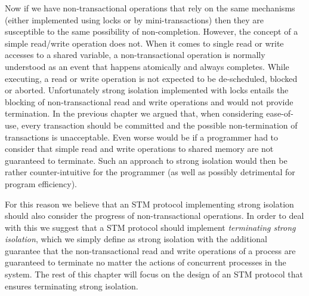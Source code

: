 Now if we have non-transactional operations that rely on the same mechanisms
(either implemented using locks or by mini-transactions) then they are susceptible
to the same possibility of non-completion.
However, the concept of a simple read/write operation does not.
When it  comes to single read or  write accesses  to  a shared
variable, a  non-transactional operation is normally understood  as an
event  that  happens   atomically  and always  completes.
While executing, a  read  or write  operation   is  not 
expected  to  be de-scheduled, blocked or aborted.  
Unfortunately   strong
isolation  implemented with  locks  entails the blocking  
of non-transactional read and write operations and would not provide termination.
In the previous chapter we argued that, when considering ease-of-use, 
every transaction should be committed and the
possible non-termination of transactions is unacceptable.
Even worse would be if a programmer had to consider that simple
read and write operations to shared memory are not guaranteed to terminate.
Such an approach to strong isolation would then be rather counter-intuitive for the 
programmer (as well as possibly detrimental for program efficiency).

For this reason we believe that an STM protocol implementing strong
isolation should also consider the progress of non-transactional operations.
In order to deal with this we suggest that a STM protocol should implement
\emph{terminating strong isolation}, which we simply define as strong isolation
with the additional guarantee that the non-transactional read and write
operations of a process are guaranteed to terminate no matter the actions of
concurrent processes in the system.
The rest of this chapter will focus on the design of an STM protocol
that ensures terminating strong isolation.








% 





